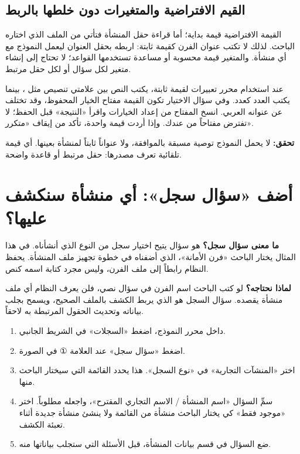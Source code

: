 \subsection{القيم الافتراضية والمتغيرات دون خلطها بالربط}

القيمة الافتراضية قيمة بداية؛ أما قراءة حقل المنشأة فتأتي من الملف الذي اختاره الباحث. لذلك لا تكتب عنوان الفرن كقيمة ثابتة: اربطه بحقل العنوان ليعمل النموذج مع أي منشأة. والمتغير قيمة محسوبة أو مساعدة تستخدمها القواعد؛ لا تحتاج إلى إنشاء متغير لكل سؤال أو لكل حقل مرتبط.

عند استخدام محرر تعبيرات لقيمة ثابتة، يكتب النص بين علامتي تنصيص مثل ، بينما يكتب العدد كعدد. وفي سؤال الاختيار تكون القيمة مفتاح الخيار المحفوظ، وقد تختلف عن عنوانه العربي. انسخ المفتاح من إعداد الخيارات واقرأ «النتيجة» قبل الحفظ؛ لا تفترض مفتاحاً من عندك. وإذا أردت قيمة واحدة، تأكد من إيقاف «متكرر».

\textbf{تحقق:} لا يحمل النموذج توصية مسبقة بالموافقة، ولا عنواناً ثابتاً لمنشأة بعينها. أي قيمة تلقائية تعرف مصدرها: حقل مرتبط أو قاعدة واضحة.

\section{أضف «سؤال سجل»: أي منشأة سنكشف عليها؟}
\label{sec:build-record-question}

\textbf{ما معنى سؤال سجل؟} هو سؤال يتيح اختيار سجل من النوع الذي أنشأناه. في هذا المثال يختار الباحث «فرن الأمانة»، الذي أضفناه في خطوة تجهيز ملف المنشأة. يحفظ النظام رابطاً إلى ملف الفرن، وليس مجرد كتابة اسمه كنص.

\textbf{لماذا نحتاجه؟} لو كتب الباحث اسم الفرن في سؤال نصي، فلن يعرف النظام أي ملف منشأة يقصده. سؤال السجل هو الذي يربط الكشف بالملف الصحيح، ويسمح بجلب بياناته وتحديث الحقول المرتبطة به لاحقاً.

\begin{enumerate}
\item داخل محرر النموذج، اضغط «السجلات» في الشريط الجانبي.
\item اضغط «سؤال سجل» عند العلامة ① في الصورة.
\item اختر «المنشآت التجارية» في «نوع السجل». هذا يحدد القائمة التي سيختار الباحث منها.
\item سمِّ السؤال «اسم المنشأة / الاسم التجاري المقترح»، واجعله مطلوباً. اختر «موجود فقط» كي يختار الباحث منشأة من القائمة ولا ينشئ منشأة جديدة أثناء تعبئة الكشف.
\item ضع السؤال في قسم بيانات المنشأة، قبل الأسئلة التي ستجلب بياناتها منه.
\end{enumerate}

